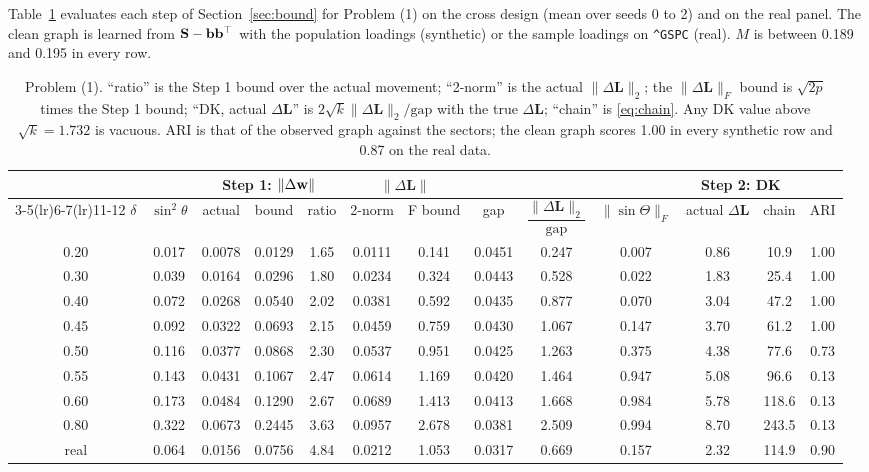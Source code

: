 \documentclass[11pt,a4paper]{article}
\newcommand{\Lap}{\mathbf{L}}
\newcommand{\Smat}{\mathbf{S}}
\theoremstyle{remark}
\begin{document}
Table~\ref{tab:bound} evaluates each step of Section~\ref{sec:bound} for Problem (1) on
the cross design (mean over seeds 0 to 2) and on the real panel. The clean graph is
learned from $\Smat-\bvec\bvec^\top$ with the population loadings (synthetic) or the
sample loadings on \texttt{\^{}GSPC} (real). $M$ is between 0.189 and 0.195 in every
row.

\begin{table}[h]
\centering\footnotesize\setlength{\tabcolsep}{3pt}
\begin{tabular}{ccccccccccccc}
\toprule
 & & \multicolumn{3}{c}{Step 1: $\lVert\Delta\mathbf w\rVert$} & \multicolumn{2}{c}{$\lVert\Delta\Lap\rVert$} & & & & \multicolumn{2}{c}{Step 2: DK} & \\
\cmidrule(lr){3-5}\cmidrule(lr){6-7}\cmidrule(lr){11-12}
$\delta$ & $\sin^2\theta$ & actual & bound & ratio & 2-norm & F bound & gap & $\dfrac{\lVert\Delta\Lap\rVert_2}{\mathrm{gap}}$ & $\lVert\sin\Theta\rVert_F$ & actual $\Delta\Lap$ & chain & ARI \\
\midrule
0.20 & 0.017 & 0.0078 & 0.0129 & 1.65 & 0.0111 & 0.141 & 0.0451 & 0.247 & 0.007 & 0.86 & 10.9 & 1.00 \\
0.30 & 0.039 & 0.0164 & 0.0296 & 1.80 & 0.0234 & 0.324 & 0.0443 & 0.528 & 0.022 & 1.83 & 25.4 & 1.00 \\
0.40 & 0.072 & 0.0268 & 0.0540 & 2.02 & 0.0381 & 0.592 & 0.0435 & 0.877 & 0.070 & 3.04 & 47.2 & 1.00 \\
0.45 & 0.092 & 0.0322 & 0.0693 & 2.15 & 0.0459 & 0.759 & 0.0430 & 1.067 & 0.147 & 3.70 & 61.2 & 1.00 \\
0.50 & 0.116 & 0.0377 & 0.0868 & 2.30 & 0.0537 & 0.951 & 0.0425 & 1.263 & 0.375 & 4.38 & 77.6 & 0.73 \\
0.55 & 0.143 & 0.0431 & 0.1067 & 2.47 & 0.0614 & 1.169 & 0.0420 & 1.464 & 0.947 & 5.08 & 96.6 & 0.13 \\
0.60 & 0.173 & 0.0484 & 0.1290 & 2.67 & 0.0689 & 1.413 & 0.0413 & 1.668 & 0.984 & 5.78 & 118.6 & 0.13 \\
0.80 & 0.322 & 0.0673 & 0.2445 & 3.63 & 0.0957 & 2.678 & 0.0381 & 2.509 & 0.994 & 8.70 & 243.5 & 0.13 \\
\midrule
real & 0.064 & 0.0156 & 0.0756 & 4.84 & 0.0212 & 1.053 & 0.0317 & 0.669 & 0.157 & 2.32 & 114.9 & 0.90 \\
\bottomrule
\end{tabular}
\caption{Problem (1). ``ratio'' is the Step 1 bound over the actual movement;
``2-norm'' is the actual $\lVert\Delta\Lap\rVert_2$; the $\lVert\Delta\Lap\rVert_F$ bound is $\sqrt{2p}$ times the Step 1 bound; ``DK, actual
$\Delta\Lap$'' is $2\sqrt k\lVert\Delta\Lap\rVert_2/\mathrm{gap}$ with the true
$\Delta\Lap$; ``chain'' is \eqref{eq:chain}. Any DK value above
$\sqrt k=1.732$ is vacuous. ARI is that of the observed graph against the sectors; the
clean graph scores 1.00 in every synthetic row and 0.87 on the real data.}
\label{tab:bound}
\end{table}
\end{document}
